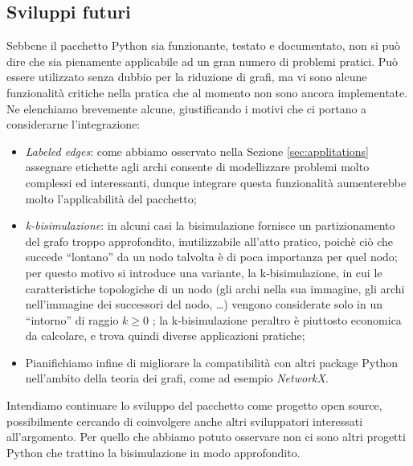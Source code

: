 \subsection{Sviluppi futuri}
Sebbene il pacchetto Python sia funzionante, testato e documentato, non si può dire che sia pienamente applicabile ad un gran numero di problemi pratici. Può essere utilizzato senza dubbio per la riduzione di grafi, ma vi sono alcune funzionalità critiche nella pratica che al momento non sono ancora implementate. Ne elenchiamo brevemente alcune, giustificando i motivi che ci portano a considerarne l'integrazione:
\begin{itemize}
    \item \emph{Labeled edges}: come abbiamo osservato nella Sezione \ref{sec:applitations} assegnare etichette agli archi consente di modellizzare problemi molto complessi ed interessanti, dunque integrare questa funzionalità aumenterebbe molto l'applicabilità del pacchetto;
    \item \emph{k-bisimulazione}: in alcuni casi la bisimulazione fornisce un partizionamento del grafo troppo approfondito, inutilizzabile all'atto pratico, poichè ciò che succede ``lontano'' da un nodo talvolta è di poca importanza per quel nodo; per questo motivo si introduce una variante, la k-bisimulazione, in cui le caratteristiche topologiche di un nodo (gli archi nella sua immagine, gli archi nell'immagine dei successori del nodo, \dots) vengono considerate solo in un ``intorno'' di raggio $k \geq 0$ \cite{kbisi}; la k-bisimulazione peraltro è piuttosto economica da calcolare, e trova quindi diverse applicazioni pratiche;
    \item Pianifichiamo infine di migliorare la compatibilità con altri package Python nell'ambito della teoria dei grafi, come ad esempio \emph{NetworkX}.
\end{itemize}

Intendiamo continuare lo sviluppo del pacchetto come progetto open source, possibilmente cercando di coinvolgere anche altri sviluppatori interessati all'argomento. Per quello che abbiamo potuto osservare non ci sono altri progetti Python che trattino la bisimulazione in modo approfondito.
